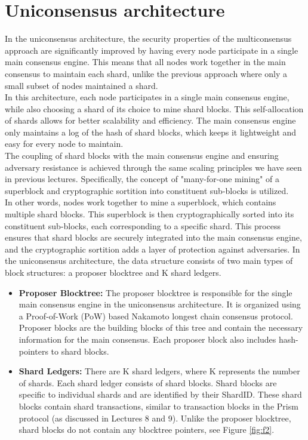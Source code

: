 \documentclass{report}
\begin{document}
\section{Uniconsensus architecture}
In the uniconsensus architecture, the security properties of the multiconsensus approach are significantly improved by having every node participate in a single main consensus engine. This means that all nodes work together in the main consensus to maintain each shard, unlike the previous approach where only a small subset of nodes maintained a shard.\\
In this architecture, each node participates in a single main consensus engine, while also choosing a shard of its choice to mine shard blocks. This self-allocation of shards allows for better scalability and efficiency. The main consensus engine only maintains a log of the hash of shard blocks, which keeps it lightweight and easy for every node to maintain.\\
The coupling of shard blocks with the main consensus engine and ensuring adversary resistance is achieved through the same scaling principles we have seen in previous lectures. Specifically, the concept of "many-for-one mining" of a superblock and cryptographic sortition into constituent sub-blocks is utilized.\\
In other words, nodes work together to mine a superblock, which contains multiple shard blocks. This superblock is then cryptographically sorted into its constituent sub-blocks, each corresponding to a specific shard. This process ensures that shard blocks are securely integrated into the main consensus engine, and the cryptographic sortition adds a layer of protection against adversaries.
In the uniconsensus architecture, the data structure consists of two main types of block structures: a proposer blocktree and K shard ledgers.\\
\begin{itemize}
	\item \textbf{Proposer Blocktree:} The proposer blocktree is responsible for the single main consensus engine in the uniconsensus architecture. It is organized using a Proof-of-Work (PoW) based Nakamoto longest chain consensus protocol. Proposer blocks are the building blocks of this tree and contain the necessary information for the main consensus. Each proposer block also includes hash-pointers to shard blocks.
	\item \textbf{Shard Ledgers:} There are K shard ledgers, where K represents the number of shards. Each shard ledger consists of shard blocks. Shard blocks are specific to individual shards and are identified by their ShardID. These shard blocks contain shard transactions, similar to transaction blocks in the Prism protocol (as discussed in Lectures 8 and 9). Unlike the proposer blocktree, shard blocks do not contain any blocktree pointers, see Figure \ref{fig:f2}.
\end{itemize}
\end{document}
